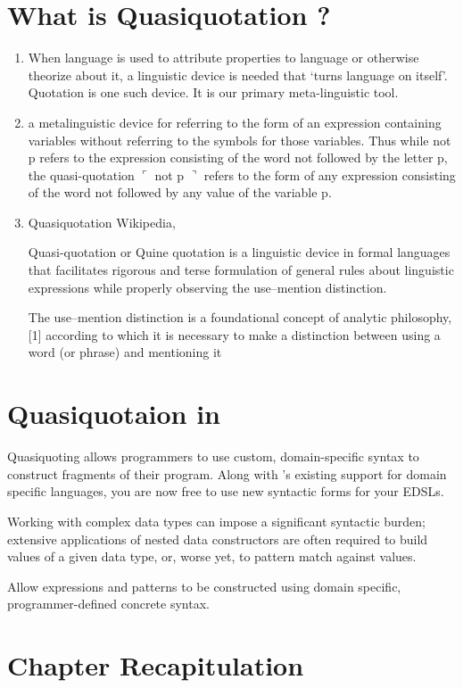 \documentclass[thesis-solanki.tex]{subfiles}
\begin{document}
\section{What is Quasiquotation ?}
\begin{enumerate}
\item \cite{website:quotationstanford}

When language is used to attribute properties to language or otherwise theorize about it, a linguistic device is needed that ‘turns 
language on itself’. Quotation is one such device. It is our primary meta-linguistic tool.

\item \cite{website:quasiquotationfreedictionary}

a metalinguistic device for referring to the form of an expression containing variables without referring to the symbols for those 
variables. Thus while not p refers to the expression consisting of the word not followed by the letter p, the quasi-quotation \newline
$\ulcorner$ not p $\urcorner$ refers to the form of any expression consisting of the word not followed by any value of the variable p.

\item  Quasiquotation Wikipedia, \cite{wikiquasi}

Quasi-quotation or Quine quotation is a linguistic device in formal languages that facilitates rigorous and terse formulation of general rules about linguistic expressions while properly observing the use–mention distinction.

\cite{website:usementiondistinctionwiki}
The use–mention distinction is a foundational concept of analytic philosophy,[1] according to which it is necessary to make a distinction 
between using a word (or phrase) and mentioning it


\end{enumerate}

\section{Quasiquotaion in }
\cite{haskellquasi, mainland2007s} 

Quasiquoting allows programmers to use custom, domain-specific syntax to construct fragments of their program. Along with 
's existing support for domain specific languages, you are now free to use new syntactic forms for your EDSLs. 

Working with complex data types can impose a significant syntactic burden; extensive applications of nested data constructors are often 
required to build values of a given data type, or, worse yet, to pattern match against values.

Allow  expressions and patterns to be constructed using domain specific, programmer-defined concrete syntax.


\section{Chapter Recapitulation}
\end{document}
